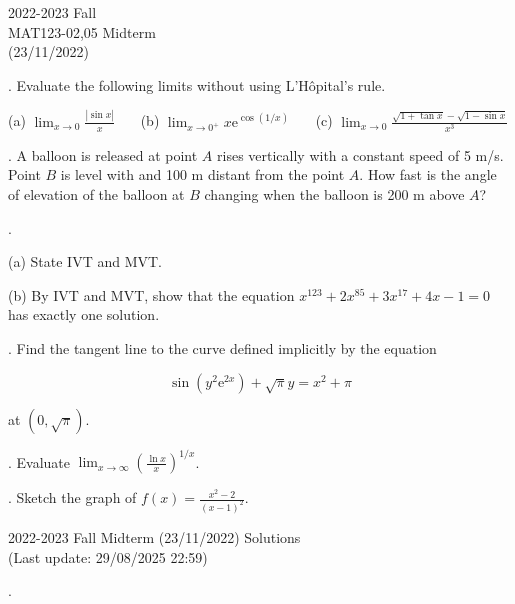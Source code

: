 \documentclass{article}
\begin{document}
\pagestyle{empty}
\large

\begin{center}
2022-2023 Fall \\MAT123-02,05 Midterm\\(23/11/2022)
\end{center}

. Evaluate the following limits without using L'Hôpital's rule.

\hfill

(a) $\displaystyle \lim_{x\to 0} \frac{\left|\sin x\right|}{x}$ \ \ \ (b) $\displaystyle \lim_{x\to 0^+}x\mathrm{e}^{\displaystyle \cos(1/x)}$ \ \ \ (c) $\displaystyle \lim_{x\to 0}{\frac{\sqrt{1+\tan x} -\sqrt{1-\sin x} }{x^3}}$

\hfill

. A balloon is released at point $A$ rises vertically with a constant speed of 5 m/s. Point $B$ is level with and 100 m distant from the point $A$. How fast is the angle of elevation of the balloon at $B$ changing when the balloon is 200 m above $A$?

\hfill

.

\hfill

\noindent (a) State IVT and MVT.

\hfill

\noindent (b) By IVT and MVT, show that the equation $x^{123}+2x^{85} + 3x^{17} + 4x-1 = 0$ has exactly one solution.

\hfill

. Find the tangent line to the curve defined implicitly by the equation

\[\sin\left(y^2\mathrm{e}^{2x}\right)+\sqrt{\pi}y=x^2+\pi\]

\noindent at $\left(0, \sqrt\pi\right).$

\hfill

. Evaluate $\displaystyle \lim_{x \to \infty} \left(\frac{\ln x}{x}\right)^{1/x}$.

\hfill

. Sketch the graph of $\displaystyle f(x) = \frac{x^2-2}{(x-1)^2}$.

\newpage

\begin{center}
2022-2023 Fall Midterm (23/11/2022) Solutions\\
(Last update: 29/08/2025 22:59)
\end{center}

.
\end{document}
